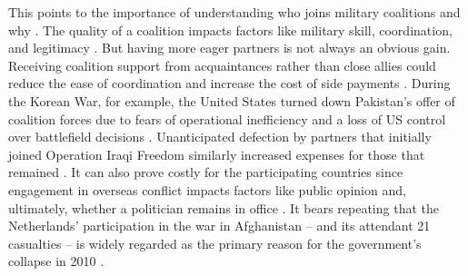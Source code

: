 \documentclass[12pt,letterpaper]{article}
\begin{document}
	This points to the importance of understanding who joins military coalitions and why \citep{wolford_politicsmilitarycoalitions_2015, moller_fightingfriendsinstitutional_2016}. The quality of a coalition impacts factors like military skill, coordination, and legitimacy \citep{kreps_coalitionsconvenienceunited_2011, auerswald_natoafghanistanfighting_2014, saideman_ambivalentcoalitiondoing_2016, cranmer_coalitionqualitymultinational_2018, cappellazielinski_organizingperformancecoalition_2020}. But having more eager partners is not always an obvious gain. Receiving coalition support from acquaintances rather than close allies could reduce the ease of coordination and increase the cost of side payments \citep{morrow_alliancesasymmetryalternative_1991, papayoanou_intraalliancebargainingbosnia_1997, wolford_politicsmilitarycoalitions_2015, henke_buyingalliespayment_2019}. During the Korean War, for example, the United States turned down Pakistan's offer of coalition forces due to fears of operational inefficiency and a loss of US control over battlefield decisions \citep{stueck_koreanwarinternational_1997}. Unanticipated defection by partners that initially joined Operation Iraqi Freedom similarly increased expenses for those that remained \citep[12-13]{mcinnis_varietiesdefectionstrategies_2019}. It can also prove costly for the participating countries since engagement in overseas conflict impacts factors like public opinion and, ultimately, whether a politician remains in office \citep{chiozza_leadersinternationalconflict_2011, wolford_nationalleaderspolitical_2016, mello_pathscoalitiondefection_2020}. It bears repeating that the Netherlands' participation in the war in Afghanistan -- and its attendant 21 casualties -- is widely regarded as the primary reason for the government's collapse in 2010 \citep[152-156]{auerswald_natoafghanistanfighting_2014}.
\end{document}
